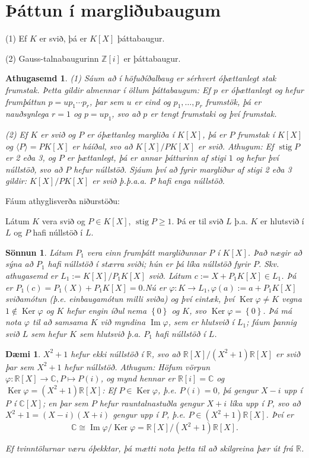 \documentclass[a4paper,icelandic,11pt]{book}
\theoremstyle{plain}
\newtheorem{daemi}{Dæmi}[chapter]
\newtheorem*{ath}{Athugasemd}
\newtheorem*{sonnun}{Sönnun}
\newcommand{\R}{\mathbb{R}}
\newcommand{\Z}{\mathbb{Z}}
\newcommand{\C}{\mathbb{C}}
\DeclareMathOperator{\im}{Im} %
\DeclareMathOperator{\Ker}{Ker} %
\DeclareMathOperator{\stig}{stig} %
\begin{document}
\section{Þáttun í margliðubaugum}
\begin{fylgisetn}
  (1) Ef $K$ er svið, þá er $K[X]$ þáttabaugur.

  (2) Gauss-talnabaugurinn $\Z[i]$ er þáttabaugur.
\end{fylgisetn}
\begin{ath}
  (1) Sáum að í höfuðíðalbaug er sérhvert óþættanlegt stak frumstak. Þetta
  gildir almennar í öllum þáttabaugum: Ef $p$ er óþættanlegt og hefur frumþáttun
  $p=up_1\cdots p_r$, þar sem $u$ er eind og $p_1,\dots,p_r$ frumstök, þá er
  nauðsynlega $r=1$ og $p=up_1$, svo að $p$ er tengt frumstaki og því frumstak.

  (2) Ef $K$ er svið og $P$ er óþættanleg margliða í $K[X]$, þá er $P$ frumstak
  í $K[X]$ og $\langle P\rangle = PK[X]$ er háíðal, svo að $K[X]/PK[X]$ er svið.
  Athugum: Ef $\stig P$ er 2 eða 3, og $P$ er þættanlegt, þá er annar þátturinn
  af stigi $1$ og hefur því núllstöð, svo að $P$ hefur núllstöð. Sjáum því að
  fyrir margliður af stigi 2 eða 3 gildir: $K[X]/PK[X]$ er svið þ.þ.a.a.
  $P$ hafi enga núllstöð.
\end{ath}
Fáum athyglisverða niðurstöðu:
\begin{fylgisetn}
  Látum $K$ vera svið og $P\in K[X]$, $\stig P\geq 1$. Þá er til svið $L$ þ.a.
  $K$ er hlutsvið í $L$ og $P$ hafi núllstöð í $L$.
\end{fylgisetn}
\begin{sonnun}
  Látum $P_1$ vera einn frumþátt margliðunnar $P$ í $K[X]$. Það nægir að sýna að
  $P_1$ hafi núllstöð í stærra sviði; hún er þá líka núllstöð fyrir $P$. Skv.
  athugasemd er $L_1 := K[X]/P_1K[X]$ svið. Látum $c := X+P_1 K[X]\in L_1$. Þá
  er $P_1(c)=P_1(X)+P_1K[X]=0$.\footnotemark Nú er $\varphi:K\to
  L_1,\varphi(a):=a+P_1K[X]$ sviðamótun (þ.e. einbaugamótun milli sviða) og því
  eintæk, því $\Ker\varphi\neq K$ vegna $1\notin\Ker\varphi$ og $K$ hefur engin
  íðul nema $\left\{ 0 \right\}$ og $K$, svo $\Ker\varphi=\left\{ 0
  \right\}$. Þá má nota $\varphi$ til að samsama $K$ við myndina $\im\varphi$,
  sem er hlutsvið í $L_1$; fáum þannig svið $L$ sem hefur $K$ sem hlutsvið þ.a.
  $P_1$ hafi núllstöð í $L$.
\end{sonnun}
\begin{daemi}
  $X^2+1$ hefur ekki núllstöð í $\R$, svo að $\R[X]/(X^2+1)\R[X]$ er svið þar
  sem $X^2+1$ hefur núllstöð. Athugum: Höfum vörpun $\varphi:\R[X]\to\C,P\mapsto
  P(i)$, og mynd hennar er $\R[i]=\C$ og $\Ker\varphi=(X^2+1)\R[X]$: Ef
  $P\in\Ker\varphi$, þ.e. $P(i)=0$, þá gengur $X-i$ upp í $P$ í $\C[X]$; en þar
  sem $P$ hefur rauntalnastuðla gengur $X+i$ líka upp í $P$, svo að
  $X^2+1 = (X-i)(X+i)$ gengur upp í $P$, þ.e. $P\in(X^2+1)\R[X]$. Því er
  \[
  \C\cong\im\varphi/\Ker\varphi = \R[X]/(X^2+1)\R[X].
  \]
  
  Ef tvinntölurnar væru óþekktar, þá mætti nota þetta til að skilgreina þær út
  frá $\R$.
\end{daemi}
\end{document}
